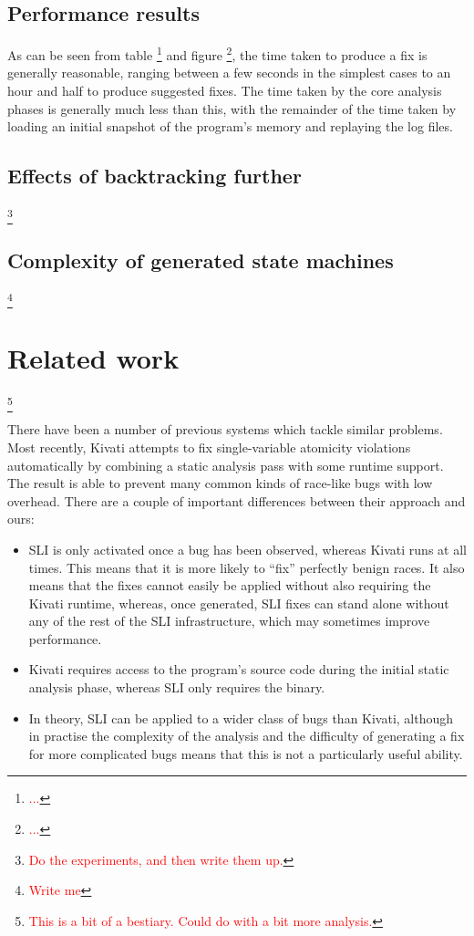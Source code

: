 \documentclass[10pt,twocolumn,preprint,natbib,authoryear]{sigplanconf}
\newcommand{\editorial}[1]{\textcolor{red}{\footnote{\textcolor{red}{#1}}}}
\begin{document}
\subsection{Performance results}

As can be seen from table \editorial{...} and figure \editorial{...},
the time taken to produce a fix is generally reasonable, ranging
between a few seconds in the simplest cases to an hour and half to
produce suggested fixes.  The time taken by the core analysis phases
is generally much less than this, with the remainder of the time
taken by loading an initial snapshot of the program's memory and
replaying the log files.

\subsection{Effects of backtracking further}

\editorial{Do the experiments, and then write them up.}

\subsection{Complexity of generated state machines}

\editorial{Write me}

\section{Related work}\editorial{This is a bit of a bestiary.  Could do with a bit more analysis.}

There have been a number of previous systems which tackle similar
problems.  Most recently, Kivati\cite{Chew2010a} attempts to fix
single-variable atomicity violations automatically by combining a
static analysis pass with some runtime support.  The result is able to
prevent many common kinds of race-like bugs with low overhead.  There
are a couple of important differences between their approach and ours:

\begin{itemize}
\item SLI is only activated once a bug has been observed, whereas
  Kivati runs at all times.  This means that it is more likely to
  ``fix'' perfectly benign races.  It also means that the fixes cannot
  easily be applied without also requiring the Kivati runtime,
  whereas, once generated, SLI fixes can stand alone without any of
  the rest of the SLI infrastructure, which may sometimes improve
  performance.

\item Kivati requires access to the program's source code during the
  initial static analysis phase, whereas SLI only requires the binary.

\item In theory, SLI can be applied to a wider class of bugs than
  Kivati, although in practise the complexity of the analysis and the
  difficulty of generating a fix for more complicated bugs means that
  this is not a particularly useful ability.
\end{itemize}
\end{document}
